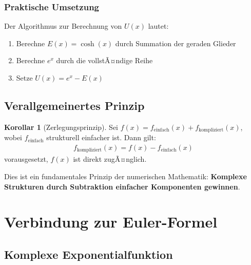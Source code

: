﻿\documentclass[a4paper,12pt]{article}
\theoremstyle{definition}
\newtheorem{korollar}{Korollar}
\begin{document}
\subsubsection{Praktische Umsetzung}

Der Algorithmus zur Berechnung von $U(x)$ lautet:
\begin{enumerate}
  \item Berechne $E(x) = \cosh(x)$ durch Summation der geraden Glieder
  \item Berechne $e^x$ durch die vollstÃ¤ndige Reihe
  \item Setze $U(x) = e^x - E(x)$
\end{enumerate}

\subsection{Verallgemeinertes Prinzip}

\begin{korollar}[Zerlegungsprinzip]
Sei $f(x) = f_{\text{einfach}}(x) + f_{\text{kompliziert}}(x)$, wobei
$f_{\text{einfach}}$ strukturell einfacher ist. Dann gilt:
\begin{align}
  f_{\text{kompliziert}}(x) = f(x) - f_{\text{einfach}}(x)
\end{align}
vorausgesetzt, $f(x)$ ist direkt zugÃ¤nglich.
\end{korollar}

Dies ist ein fundamentales Prinzip der numerischen Mathematik:
\textbf{Komplexe Strukturen durch Subtraktion einfacher Komponenten gewinnen}.

\section{Verbindung zur Euler-Formel}

\subsection{Komplexe Exponentialfunktion}
\end{document}
